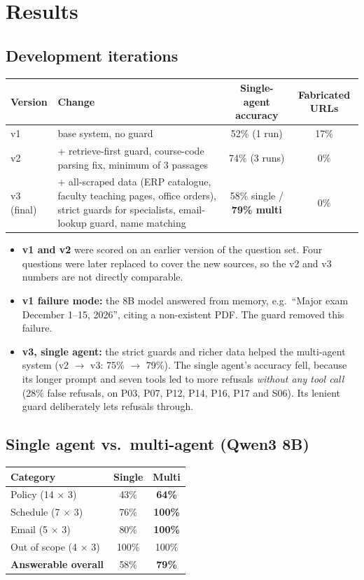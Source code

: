 \documentclass[11pt,a4paper]{article}
\begin{document}
\section{Results}

\subsection{Development iterations}
\begin{tabularx}{\textwidth}{@{}lYcc@{}}
\toprule
Version & Change & Single-agent accuracy & Fabricated URLs \\ \midrule
v1 & base system, no guard & 52\% (1 run) & 17\% \\
v2 & + retrieve-first guard, course-code parsing fix, minimum of 3 passages & 74\% (3 runs) & 0\% \\
v3 (final) & + all-scraped data (ERP catalogue, faculty teaching pages, office orders), strict guards for specialists, email-lookup guard, name matching & 58\% single / \textbf{79\% multi} & 0\% \\
\bottomrule
\end{tabularx}

\begin{itemize}
  \item \textbf{v1 and v2} were scored on an earlier version of the question set. Four questions were later
        replaced to cover the new sources, so the v2 and v3 numbers are not directly comparable.
  \item \textbf{v1 failure mode:} the 8B model answered from memory, e.g.\ ``Major exam December 1--15, 2026'',
        citing a non-existent PDF. The guard removed this failure.
  \item \textbf{v3, single agent:} the strict guards and richer data helped the multi-agent system (v2 $\rightarrow$
        v3: 75\% $\rightarrow$ 79\%). The single agent's accuracy fell, because its longer prompt and seven tools
        led to more refusals \emph{without any tool call} (28\% false refusals, on P03, P07, P12, P14, P16, P17 and
        S06). Its lenient guard deliberately lets refusals through.
\end{itemize}

\subsection{Single agent vs.\ multi-agent (Qwen3 8B)}
\begin{tabular}{@{}lcc@{}}
\toprule
Category & Single & Multi \\ \midrule
Policy (14 $\times$ 3) & 43\% & \textbf{64\%} \\
Schedule (7 $\times$ 3) & 76\% & \textbf{100\%} \\
Email (5 $\times$ 3) & 80\% & \textbf{100\%} \\
Out of scope (4 $\times$ 3) & 100\% & 100\% \\
\textbf{Answerable overall} & 58\% & \textbf{79\%} \\
\bottomrule
\end{tabular}
\end{document}
